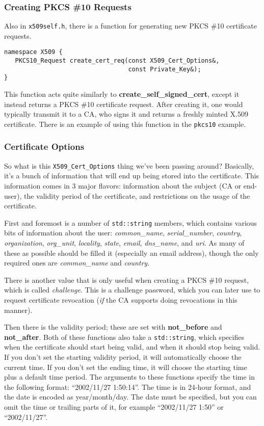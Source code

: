 \documentclass{article}
\newcommand{\filename}[1]{\texttt{#1}}
\newcommand{\function}[1]{\textbf{#1}}
\newcommand{\type}[1]{\texttt{#1}}
\renewcommand{\arg}[1]{\textsl{#1}}
\begin{document}
\subsubsection{Creating PKCS \#10 Requests}

Also in \filename{x509self.h}, there is a function for generating new PKCS \#10
certificate requests.

\begin{verbatim}
namespace X509 {
   PKCS10_Request create_cert_req(const X509_Cert_Options&,
                                  const Private_Key&);
}
\end{verbatim}

This function acts quite similarly to \function{create\_self\_signed\_cert},
except it instead returns a PKCS \#10 certificate request. After creating it,
one would typically transmit it to a CA, who signs it and returns a freshly
minted X.509 certificate. There is an example of using this function in the
\filename{pkcs10} example.

\subsubsection{Certificate Options}

So what is this \type{X509\_Cert\_Options} thing we've been passing around?
Basically, it's a bunch of information that will end up being stored into the
certificate. This information comes in 3 major flavors: information about the
subject (CA or end-user), the validity period of the certificate, and
restrictions on the usage of the certificate.

First and foremost is a number of \type{std::string} members, which contains
various bits of information about the user: \arg{common\_name},
\arg{serial\_number}, \arg{country}, \arg{organization}, \arg{org\_unit},
\arg{locality}, \arg{state}, \arg{email}, \arg{dns\_name}, and \arg{uri}. As
many of these as possible should be filled it (especially an email address),
though the only required ones are \arg{common\_name} and \arg{country}.

There is another value that is only useful when creating a PKCS \#10 request,
which is called \arg{challenge}. This is a challenge password, which you can
later use to request certificate revocation (\emph{if} the CA supports doing
revocations in this manner).

Then there is the validity period; these are set with \function{not\_before}
and \function{not\_after}. Both of these functions also take a
\type{std::string}, which specifies when the certificate should start being
valid, and when it should stop being valid. If you don't set the starting
validity period, it will automatically choose the current time. If you don't
set the ending time, it will choose the starting time plus a default time
period. The arguments to these functions specify the time in the following
format: ``2002/11/27 1:50:14''. The time is in 24-hour format, and the date is
encoded as year/month/day. The date must be specified, but you can omit the
time or trailing parts of it, for example ``2002/11/27 1:50'' or
``2002/11/27''.
\end{document}
